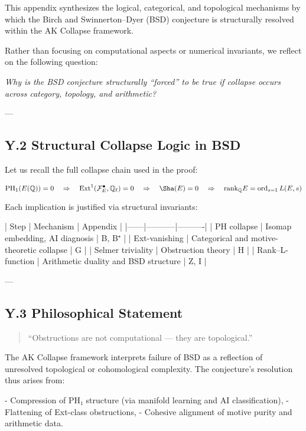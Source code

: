 This appendix synthesizes the logical, categorical, and topological mechanisms  
by which the Birch and Swinnerton–Dyer (BSD) conjecture is structurally resolved  
within the AK Collapse framework.

Rather than focusing on computational aspects or numerical invariants,  
we reflect on the following question:

\begin{center}
\textit{Why is the BSD conjecture structurally “forced” to be true  
if collapse occurs across category, topology, and arithmetic?}
\end{center}

---

\subsection*{Y.2 Structural Collapse Logic in BSD}

Let us recall the full collapse chain used in the proof:

\[
\mathrm{PH}_1(E(\mathbb{Q})) = 0
\quad \Rightarrow \quad
\mathrm{Ext}^1(\mathcal{F}_E^\bullet, \mathbb{Q}_\ell) = 0
\quad \Rightarrow \quad
\Sha(E) = 0
\quad \Rightarrow \quad
\mathrm{rank}_{\mathbb{Q}} E = \operatorname{ord}_{s=1} L(E, s)
\]

Each implication is justified via structural invariants:

| Step | Mechanism | Appendix |
|------|-----------|----------|
| PH collapse | Isomap embedding, AI diagnosis | B, B⁺ |
| Ext-vanishing | Categorical and motive-theoretic collapse | G |
| Selmer triviality | Obstruction theory | H |
| Rank–L-function | Arithmetic duality and BSD structure | Z, I |

---

\subsection*{Y.3 Philosophical Statement}

\begin{quote}
“Obstructions are not computational — they are topological.”  
\end{quote}

The AK Collapse framework interprets failure of BSD as  
a reflection of unresolved topological or cohomological complexity.  
The conjecture’s resolution thus arises from:

- Compression of PH₁ structure (via manifold learning and AI classification),
- Flattening of Ext-class obstructions,
- Cohesive alignment of motive purity and arithmetic data.

